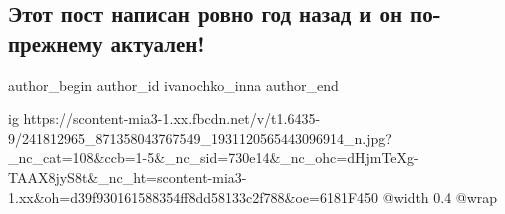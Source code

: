 
 
 
 
 
 
\subsection{Этот пост написан ровно год назад и он по-прежнему актуален!}
\label{sec:12_09_2021.fb.ivanochko_inna.1.druzja_politika}
 
\ifcmt
 author_begin
   author_id ivanochko_inna
 author_end
\fi

\ifcmt
  ig https://scontent-mia3-1.xx.fbcdn.net/v/t1.6435-9/241812965_871358043767549_1931120565443096914_n.jpg?_nc_cat=108&ccb=1-5&_nc_sid=730e14&_nc_ohc=dHjmTeXg-TAAX8jyS8t&_nc_ht=scontent-mia3-1.xx&oh=d39f930161588354ff8dd58133c2f788&oe=6181F450
  @width 0.4
  @wrap 
\fi

